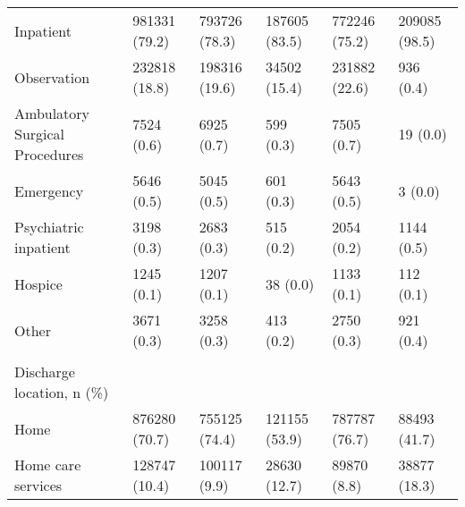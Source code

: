 \begin{adjustbox}{width={\textwidth},totalheight={\textheight},keepaspectratio,frame}
{\begin{tabular}{L{20em}C{10em}C{10em}C{10em}C{10em}C{10em}}
\hspace{3mm}                                Inpatient &      981331 (79.2) &                 793726 (78.3) &             187605 (83.5) &                  772246 (75.2) &             209085 (98.5) \\
\hspace{3mm}                              Observation &      232818 (18.8) &                 198316 (19.6) &              34502 (15.4) &                  231882 (22.6) &                 936 (0.4) \\
\hspace{3mm}           Ambulatory Surgical Procedures &         7524 (0.6) &                    6925 (0.7) &                 599 (0.3) &                     7505 (0.7) &                  19 (0.0) \\
\hspace{3mm}                                Emergency &         5646 (0.5) &                    5045 (0.5) &                 601 (0.3) &                     5643 (0.5) &                   3 (0.0) \\
\hspace{3mm}                    Psychiatric inpatient &         3198 (0.3) &                    2683 (0.3) &                 515 (0.2) &                     2054 (0.2) &                1144 (0.5) \\
\hspace{3mm}                                   Hospice &         1245 (0.1) &                    1207 (0.1) &                  38 (0.0) &                     1133 (0.1) &                 112 (0.1) \\
\hspace{3mm}                                    Other &         3671 (0.3) &                    3258 (0.3) &                 413 (0.2) &                     2750 (0.3) &                 921 (0.4) \\
&                 &                            &                        &                             &                        \\
Discharge location, n (\%) &                 &                            &                        &                             &                        \\
\hspace{3mm}                               Home &      876280 (70.7) &                 755125 (74.4) &             121155 (53.9) &                  787787 (76.7) &              88493 (41.7) \\
\hspace{3mm}                 Home care services &      128747 (10.4) &                  100117 (9.9) &              28630 (12.7) &                    89870 (8.8) &              38877 (18.3) \\

\end{tabular}}
\end{adjustbox}
